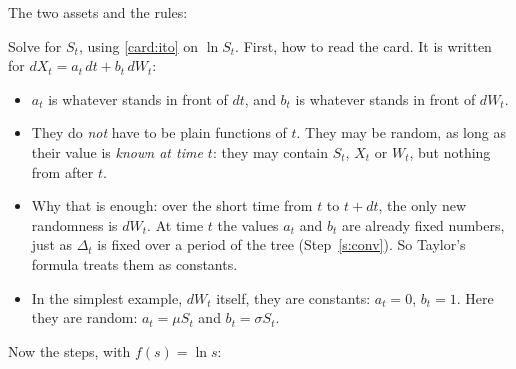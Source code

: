 \begin{steps}[resume]
\item\label{s:mkt} The two assets and the rules:
\begin{deriv}
\end{deriv}

\item\label{s:solve} Solve for $S_t$, using \cref{card:ito} on $\ln S_t$. First, how to read the card. It is written for $dX_t=a_t\,dt+b_t\,dW_t$:
\begin{itemize}
\item $a_t$ is whatever stands in front of $dt$, and $b_t$ is whatever stands in front of $dW_t$.
\item They do \emph{not} have to be plain functions of $t$. They may be random, as long as their value is \emph{known at time $t$}: they may contain $S_t$, $X_t$ or $W_t$, but nothing from after $t$.
\item Why that is enough: over the short time from $t$ to $t+dt$, the only new randomness is $dW_t$. At time $t$ the values $a_t$ and $b_t$ are already fixed numbers, just as $\Delta_t$ is fixed over a period of the tree (Step~\ref{s:conv}). So Taylor's formula treats them as constants.
\item In the simplest example, $dW_t$ itself, they are constants: $a_t=0$, $b_t=1$. Here they are random: $a_t=\mu S_t$ and $b_t=\sigma S_t$.
\end{itemize}
Now the steps, with $f(s)=\ln s$:
\begin{deriv}

\end{deriv}
\end{steps}
